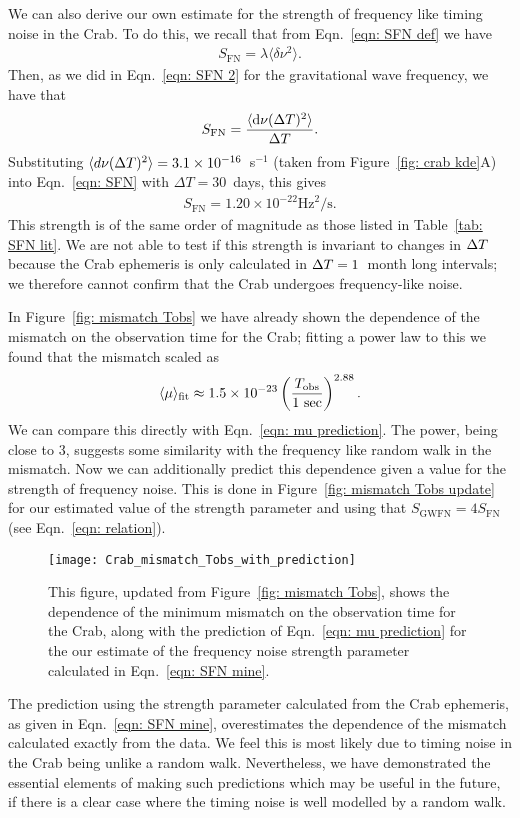 \documentclass[../full_thesis/full_thesis.tex]{subfiles}
\begin{document}
We can also derive our own estimate for the strength of frequency like timing noise
in the Crab. To do this, we recall that from Eqn.~\eqref{eqn: SFN def} we have
\begin{align}
S_{\textrm{FN}} = \lambda \langle \delta \nu^{2}\rangle.
\end{align}
Then, as we did in Eqn.~\eqref{eqn: SFN 2} for the gravitational wave frequency,
we have that
\begin{align}
S_{\textrm{FN}} = \frac{\langle \mathrm{d} \nu(\Delta T)^{2} \rangle }{\Delta T}.
\label{eqn: SFN}
\end{align}
Substituting
$\langle d\nu(\Delta T)^2 \rangle =3.1\times10^{-16}$~s$^{-1}$ (taken from Figure~\ref{fig: crab
kde}A) into Eqn.~\eqref{eqn: SFN} with $\Delta T = 30$~days, this gives
\begin{align}
S_{\mathrm{FN}} = 1.20 \times 10^{-22} \textrm{Hz}^{2}/\textrm{s}.
\label{eqn: SFN mine}
\end{align}
This strength is of the
same order of magnitude as those listed in Table~\ref{tab: SFN lit}. We are not
able to test if this strength is invariant to changes in $\Delta T$ because the
Crab ephemeris is only calculated in $\Delta T=1$~month long intervals; we therefore
cannot confirm that the Crab undergoes frequency-like noise.

In Figure~\ref{fig: mismatch Tobs} we have already shown the dependence of the
mismatch on the observation time for the Crab; fitting a power law to this
we found that the mismatch scaled as
\begin{align}
\langle \mu \rangle_{\textrm{fit}} \approx 1.5 \times 10^{-23}
\left(\frac{T_{\mathrm{obs}}}{1 \textrm{ sec}}\right)^{2.88}.
\end{align}
We can compare this directly with Eqn.~\eqref{eqn: mu prediction}. The power,
being close to $3$, suggests some similarity with the frequency like random
walk in the mismatch.  Now we can additionally predict this dependence given a
value for the strength of frequency noise. This is done in Figure~\ref{fig:
mismatch Tobs update} for our estimated value of the strength parameter and
using that $S_{\textrm{GWFN}} = 4S_\textrm{FN}$ (see Eqn.~\eqref{eqn:
relation}).
\begin{figure}[htb]
\centering
\texttt{[image: Crab\_mismatch\_Tobs\_with\_prediction]}
\caption{This figure, updated from Figure~\ref{fig: mismatch Tobs}, shows the
dependence of the minimum mismatch on the observation time for the Crab, along
with the prediction of Eqn.~\eqref{eqn: mu prediction} for the our estimate of
the frequency noise strength parameter calculated in Eqn.~\eqref{eqn: SFN mine}.}
\label{fig: mismatch Tobs update}
\end{figure}
The prediction using the strength parameter calculated from the Crab ephemeris,
as given in Eqn.~\eqref{eqn: SFN mine}, overestimates the dependence of the
mismatch calculated exactly from the data. We feel this is most likely due to timing
noise in the Crab being unlike a random walk. Nevertheless, we have
demonstrated the essential elements of making such predictions which may be useful
in the future, if there is a clear case where the timing noise is well
modelled by a random walk.
\end{document}
